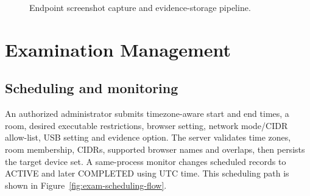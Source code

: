 \documentclass[12pt,a4paper]{report}
\begin{document}
\begin{figure}[H]
\centering
{}
\caption{Endpoint screenshot capture and evidence-storage pipeline.}
\label{fig:screenshot-capture-flow}
\end{figure}

\section{Examination Management}

\subsection{Scheduling and monitoring}
An authorized administrator submits timezone-aware start and end times, a room,
desired executable restrictions, browser setting, network mode/CIDR allow-list,
USB setting and evidence option. The server validates time zones, room
membership, CIDRs, supported browser names and overlaps, then persists the
target device set. A same-process monitor changes scheduled records to ACTIVE
and later COMPLETED using UTC time. This scheduling path is shown in
Figure~\ref{fig:exam-scheduling-flow}.
\end{document}
